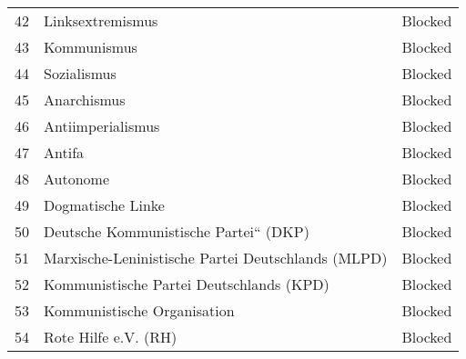 \documentclass[
	fontsize=10pt,          %
	numbers=noenddot,    	%
    parskip=half,        	%
    listof=totoc,        	%
    bibliography=totoc,  	%
	headsepline=true,       %
	footsepline=false, 		%
    DIV=12                	%
]{scrartcl}
\begin{document}
\begin{longtable}{p{1cm}p{10cm}p{3cm}}
    42 & Linksextremismus & Blocked \\
    43 & Kommunismus & Blocked \\
    44 & Sozialismus & Blocked \\
    45 & Anarchismus & Blocked \\
    46 & Antiimperialismus & Blocked \\
    47 & Antifa & Blocked \\
    48 & Autonome & Blocked \\
    49 & Dogmatische Linke & Blocked \\
    50 & Deutsche Kommunistische Partei“ (DKP) & Blocked \\
    51 & Marxische-Leninistische Partei Deutschlands (MLPD) & Blocked \\
    52 & Kommunistische Partei Deutschlands (KPD) & Blocked \\
    53 & Kommunistische Organisation & Blocked \\
    54 & Rote Hilfe e.V. (RH) & Blocked \\
\end{longtable}


\end{document}
